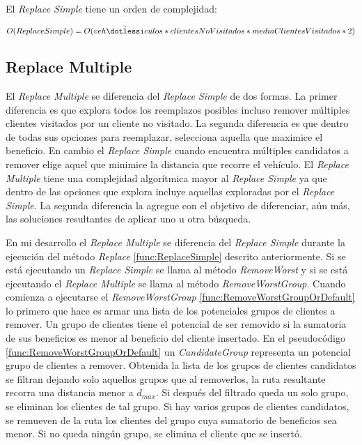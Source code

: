 \begin{minipage}{\linewidth}
El \textit{Replace Simple} tiene un orden de complejidad:

\begin{equation*}
O(Replace Simple) = O(veh\acute{\dotlessi}culos * clientesNoVisitados * mediaClientesVisitados * 2)
\end{equation*}
\end{minipage}

\bigskip

\subsection{Replace Multiple}

El \textit{Replace Multiple} se diferencia del \textit{Replace Simple} de dos formas. La primer diferencia es que explora todos los reemplazos posibles incluso remover múltiples clientes visitados por un cliente no visitado. La segunda diferencia es que dentro de todas sus opciones para reemplazar, selecciona aquella que maximice el beneficio. En cambio el \textit{Replace Simple} cuando encuentra múltiples candidatos a remover elige aquel que minimice la distancia que recorre el vehículo. El \textit{Replace Multiple} tiene una complejidad algorítmica mayor al \textit{Replace Simple} ya que dentro de las opciones que explora incluye aquellas exploradas por el \textit{Replace Simple}. La segunda diferencia la agregue con el objetivo de diferenciar, aún más, las soluciones resultantes de aplicar uno u otra búsqueda.

\bigskip

En mi desarrollo el \textit{Replace Multiple} se diferencia del \textit{Replace Simple} durante la ejecución del método \textit{Replace} \ref{func:ReplaceSimple} descrito anteriormente. Si se está ejecutando un \textit{Replace Simple} se llama al método \textit{RemoveWorst} y si se está ejecutando el \textit{Replace Multiple} se llama al método \textit{RemoveWorstGroup}. Cuando comienza a ejecutarse el \textit{RemoveWorstGroup} \ref{func:RemoveWorstGroupOrDefault} lo primero que hace es armar una lista de los potenciales grupos de clientes a remover. Un grupo de clientes tiene el potencial de ser removido si la sumatoria de sus beneficios es menor al beneficio del cliente insertado. En el pseudocódigo \ref{func:RemoveWorstGroupOrDefault} un \textit{CandidateGroup} representa un potencial grupo de clientes a remover. Obtenida la lista de los grupos de clientes candidatos se filtran dejando solo aquellos grupos que al removerlos, la ruta resultante recorra una distancia menor a $d_{max}$. Si después del filtrado queda un solo grupo, se eliminan los clientes de tal grupo. Si hay varios grupos de clientes candidatos, se remueven de la ruta los clientes del grupo cuya sumatorio de beneficios sea menor. Si no queda ningún grupo, se elimina el cliente que se insertó.

